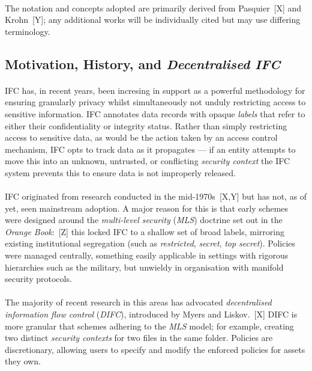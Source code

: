 \paragraph{} The notation and concepts adopted are primarily derived from Pasquier~[X] and Krohn~[Y]; any additional works will be individually cited but may use differing terminology.

\subsection{Motivation, History, and \textit{Decentralised IFC}}

\paragraph{} IFC has, in recent years, been incresing in support as a powerful methodology for ensuring granularly privacy whilst simultaneously not unduly restricting access to sensitive information. IFC annotates data records with opaque \textit{labels} that refer to either their confidentiality or integrity status. Rather than simply restricting access to sensitive data, as would be the action taken by an access control mechanism, IFC opts to track data as it propagates --- if an entity attempts to move this into an unknown, untrusted, or conflicting \textit{security context} the IFC system prevents this to ensure data is not improperly released.

\paragraph{} IFC originated from research conducted in the mid-1970s~[X,Y] but has not, as of yet, seen mainstream adoption. A major reason for this is that early schemes were designed around the \textit{multi-level security} (\textit{MLS}) doctrine set out in the \textit{Orange Book}:~[Z] this locked IFC to a shallow set of broad labels, mirroring existing institutional segregation (such as \textit{restricted}, \textit{secret}, \textit{top secret}). Policies were managed centrally, something easily applicable in settings with rigorous hierarchies such as the military, but unwieldy in organisation with manifold security protocols.

\paragraph{} The majority of recent research in this areas has advocated \textit{decentralised information flow control} 
(\textit{DIFC}), introduced by Myers and Liskov.~[X] DIFC is more granular that schemes adhering to the \textit{MLS} model; for example, creating two distinct \textit{security contexts} for two files in the same folder. Policies are discretionary, allowing users to specify and modify the enforced policies for assets they own.

